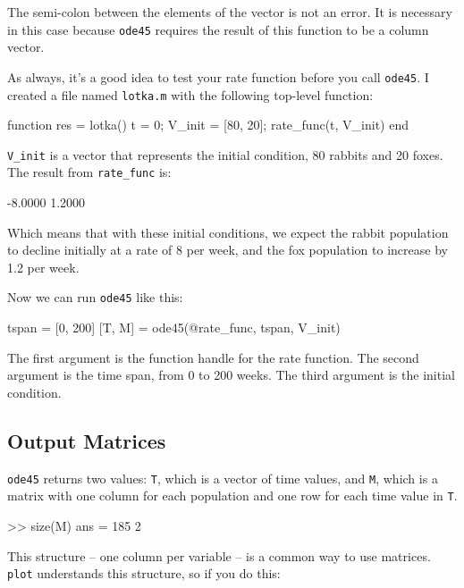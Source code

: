 The semi-colon between the elements of the vector is not an error.  It
is necessary in this case because {\tt ode45} requires the result of
this function to be a column vector.


As always, it's a good idea to test your rate function before you call {\tt ode45}.  I created a file named {\tt lotka.m} with the following top-level function:

\begin{code}
function res = lotka()
    t = 0;
    V_init = [80, 20];
    rate_func(t, V_init)
end
\end{code}


\verb"V_init" is a vector that represents the initial condition, 80 rabbits and 20 foxes.  The result from \verb"rate_func" is:

\begin{code}
-8.0000
 1.2000
 \end{code}
  
Which means that with these initial conditions, we expect the rabbit population to decline initially at a rate of 8 per week, and the fox population to increase by 1.2 per week.  
  
Now we can run {\tt ode45} like this:

\begin{code}
tspan = [0, 200]
[T, M] = ode45(@rate_func, tspan, V_init)
\end{code}

The first argument is the function handle for the rate function.
The second argument is the time span, from 0 to 200 weeks.
The third argument is the initial condition.



\subsection{Output Matrices}

{\tt ode45} returns two values: {\tt T}, which is a vector of time values, and {\tt M}, which is a matrix with one column for each
population and one row for each time value in {\tt T}.

\begin{code}
>> size(M)
ans = 185     2
\end{code}

This structure -- one column per variable -- is a common way to
use matrices.  {\tt plot} understands this structure, so if you
do this:

